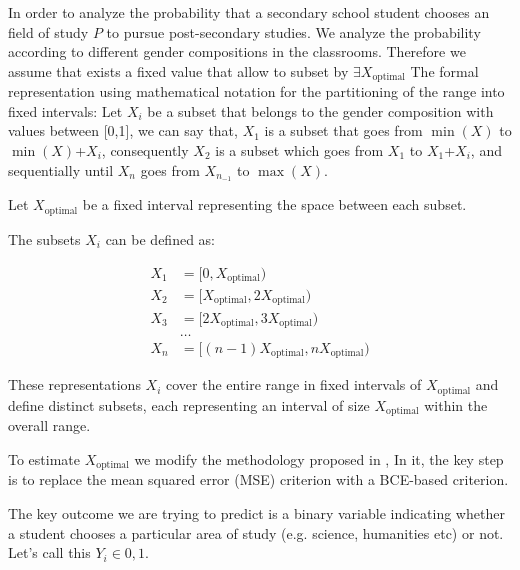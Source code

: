 In order to analyze the probability that a secondary school student chooses an field of study  $P$ to pursue post-secondary studies. We analyze the probability according to different gender compositions in the classrooms. Therefore we assume that exists a fixed value that allow to subset by $\exists X_{\text{optimal}}$  The formal representation using mathematical notation for the partitioning of the range into fixed intervals:
Let $X_i$ be a subset that belongs to the gender composition with values between [0,1], we can say that, $X_1$ is a subset that goes from $\min(X)$ to $\min(X)$+$X_i$, consequently $X_2$ is a subset which goes from $X_1$ to $X_1$+$X_i$, and sequentially until $X_n$ goes from $X_{n_{-1}}$ to $\max(X)$.



Let \( X_{\text{optimal}} \) be a fixed interval representing the space between each subset.

The subsets \( X_i \) can be defined as:

 
\begin{align*}
X_1 &= [0, X_{\text{optimal}}) \\
X_2 &= [X_{\text{optimal}}, 2X_{\text{optimal}}) \\
X_3 &= [2X_{\text{optimal}}, 3X_{\text{optimal}}) \\
& \ldots \\
X_n &= [(n-1)X_{\text{optimal}}, nX_{\text{optimal}})
\end{align*}
  


These representations \( X_i \) cover the entire range in fixed intervals of \( X_{\text{optimal}} \) and define distinct subsets, each representing an interval of size \( X_{\text{optimal}} \) within the overall range. 

To estimate \( X_{\text{optimal}} \) we modify the methodology proposed in \citet{IMBENS2012}, In it, the key step is to replace the mean squared error (MSE) criterion with a BCE-based criterion.


The key outcome we are trying to predict is a binary variable indicating whether a student chooses a particular area of study (e.g. science, humanities etc) or not. Let's call this $Y_i \in {0, 1}$.

